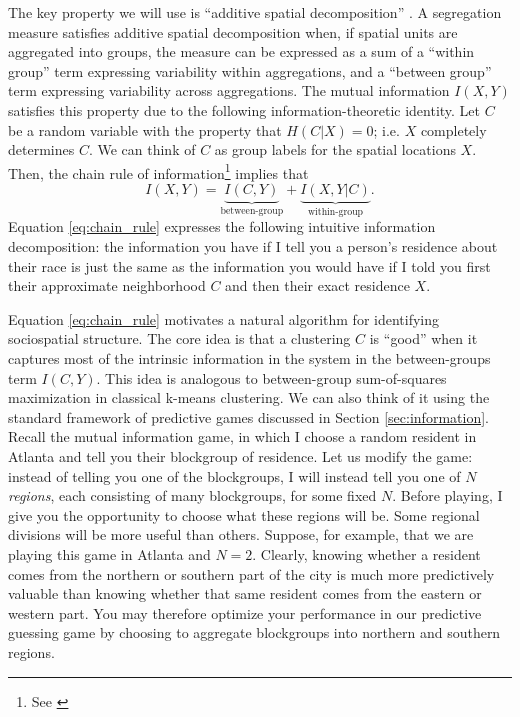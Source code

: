 \documentclass[english]{scrartcl}
\begin{document}
	The key property we will use is ``additive spatial decomposition'' \cite{Reardon2004}. A segregation measure satisfies additive spatial decomposition when, if spatial units are aggregated into groups, the measure can be expressed as a sum of a ``within group'' term expressing variability within aggregations, and a ``between group'' term expressing variability across aggregations. The mutual information $I(X,Y)$ satisfies this property due to the following information-theoretic identity. Let $C$ be a random variable with the property that $H(C|X) = 0$; i.e. $X$ completely determines $C$. We can think of $C$ as group labels for the spatial locations $X$. Then, the chain rule of information\footnote{See \cite{Cover1991}} implies that 
	\begin{equation}
		I(X,Y) = \underbrace{I(C,Y)}_{\text{between-group}} + \underbrace{I(X,Y|C)}_{\text{within-group}}. \label{eq:chain_rule}
	\end{equation}
	Equation \eqref{eq:chain_rule} expresses the following intuitive information decomposition: the information you have if I tell you a person's residence about their race is just the same as the information you would have if I told you first their approximate neighborhood $C$ and then their exact residence $X$. 

	Equation \eqref{eq:chain_rule} motivates a natural algorithm for identifying sociospatial structure. The core idea is that a clustering $C$ is ``good'' when it captures most of the intrinsic information in the system in the between-groups term $I(C,Y)$. This idea is analogous to between-group sum-of-squares maximization in classical k-means clustering. We can also think of it using the standard framework of predictive games discussed in Section \ref{sec:information}. Recall the mutual information game, in which I choose a random resident in Atlanta and tell you their blockgroup of residence. Let us modify the game: instead of telling you one of the blockgroups, I will instead tell you one of $N$ \emph{regions}, each consisting of many blockgroups, for some fixed $N$. Before playing, I give you the opportunity to choose what these regions will be. Some regional divisions will be more useful than others. Suppose, for example, that we are playing this game in Atlanta and $N = 2$. Clearly, knowing whether a resident comes from the northern or southern part of the city is much more predictively valuable than knowing whether that same resident comes from the eastern or western part. You may therefore optimize your performance in our predictive guessing game by choosing to aggregate blockgroups into northern and southern regions. 
\end{document}
